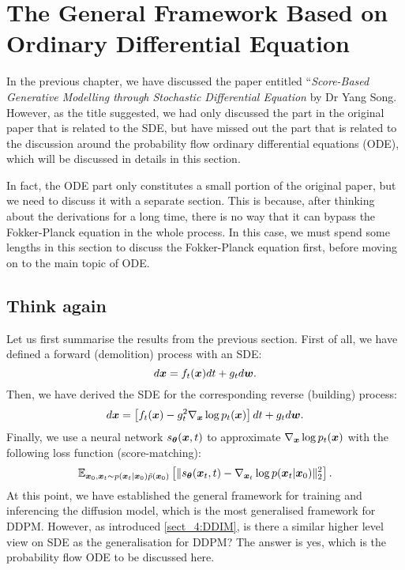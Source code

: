 \section{The General Framework Based on Ordinary Differential Equation}\label{sect:6}

In the previous chapter, we have discussed the paper entitled ``\emph{Score-Based Generative Modelling through Stochastic Differential Equation} by Dr Yang Song\cite{song2020score}. However, as the title suggested, we had only discussed the part in the original paper that is related to the SDE, but have missed out the part that is related to the discussion around the probability flow ordinary differential equations (ODE), which will be discussed in details in this section.

In fact, the ODE part only constitutes a small portion of the original paper, but we need to discuss it with a separate section. This is because, after thinking about the derivations for a long time, there is no way that it can bypass the Fokker-Planck equation in the whole process. In this case, we must spend some lengths in this section to discuss the Fokker-Planck equation first, before moving on to the main topic of ODE.

\subsection{Think again}
Let us first summarise the results from the previous section. First of all, we have defined a forward (demolition) process with an SDE:
\begin{equation}
    \label{eq:6.1}
    d\bm{x} =f_t(\bm{x})dt+g_t d\bm{w}.
\end{equation}
Then, we have derived the SDE for the corresponding reverse (building) process:
\begin{equation}
    \label{eq:6.2}
    d\bm{x}=\left[ f_t(\bm{x}) -g_t^2\nabla_{\bm{x}}\log p_t(\bm{x}) \right]dt +g_t d\bm{w}.
\end{equation}
Finally, we use a neural network $s_{\bm{\theta}}(\bm{x},t)$ to approximate $\nabla_{\bm{x}} \log p_{t}(\bm{x})$ with the following loss function (score-matching):
\begin{equation}
    \label{eq:6.3}
    \mathbb{E}_{\bm{x}_0,\bm{x}_{t}\sim p(\bm{x}_{t}|\bm{x}_0)\tilde{p}(\bm{x}_0)}\left[\| s_{\bm{\theta}}(\bm{x}_{t},t) - \nabla_{\bm{x}_t}\log p(\bm{x}_{t}|\bm{x}_0)\|_2^2 \right].
\end{equation}
At this point, we have established the general framework for training and inferencing the diffusion model, which is the most generalised framework for DDPM. However, as introduced \cref{sect_4:DDIM}, is there a similar higher level view on SDE as the generalisation for DDPM? The answer is yes, which is the probability flow ODE to be discussed here.

